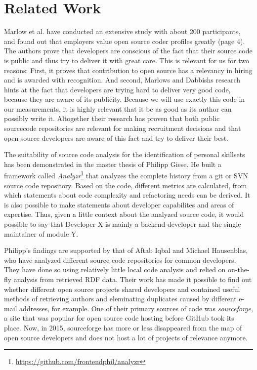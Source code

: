 \section{Related Work}
Marlow et al.\cite{md:2013} have conducted an extensive study with about
200 participants, and found out that employers value
open source coder profiles greatly (page 4). The authors prove that developers are conscious of the fact
that their source code is public and thus try to deliver it with
great care. This is relevant for us for two reasons:
First, it proves that contribution to open source has a relevancy
in hiring and is awarded with recognition. And second, Marlows and Dabbishs
research hints at the fact that developers are trying hard to deliver very
good code, because they are aware of its publicity. Because we will use
exactly this code in our measurements, it is highly relevant that it be as good as its author can possibly write it.
Altogether their research has proven that both public sourcecode repositories
are relevant for making recruitment decisions and that open source developers
are aware of this fact and try to deliver their best.
\newline

The suitability of source code analysis for the identification of personal
skillsets has been demonstrated in the master thesis of Philipp Giese\cite{pg:2014}.
He built a framework called \textit{Analyzr}\footnote{\url{https://github.com/frontendphil/analyzr}}
that analyzes the complete history from a git or SVN source code repository.
Based on the code, different metrics are calculated, from which statements about
code complexity and refactoring needs can be derived. It is also possible
to make statements about developer capabilites and areas of expertise.
Thus, given a little context about the analyzed source code, it would possible
to say that \glqq Developer X is mainly a backend developer and the single maintainer of module Y\grqq.

Philipp's findings are supported by that of
Aftab Iqbal and Michael Hausenblas, who have analyzed different
source code repositories for common developers\cite{ih:2012}.
They have done so using relatively little local code analysis and relied
on on-the-fly analysis from retrieved RDF data. Their work
has made it possible to find out whether different open source projects shared developers
and contained useful methods of retrieving authors and eleminating duplicates
caused by different e-mail addresses, for example.
One of their primary sources of code was \textit{sourceforge}, a site that was
popular for open source code hosting before GitHub took its place.
Now, in 2015, sourceforge has more or less disappeared from the map of open
source developers and does not host a lot of projects of relevance anymore.

